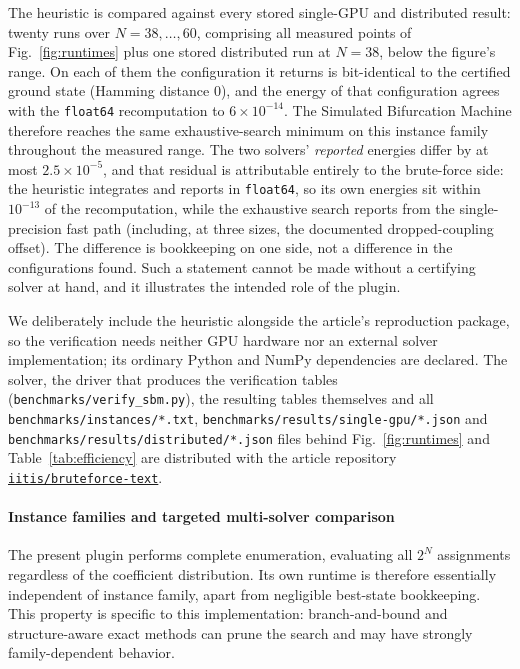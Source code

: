 \documentclass[preprint,12pt,a4paper]{elsarticle}
\newcommand{\datarepo}{https://github.com/iitis/bruteforce-text}
\newcommand{\datareponame}{\texttt{iitis/bruteforce-text}}
\begin{document}
The heuristic is compared against every stored single-GPU and distributed result: twenty runs
over $N=38,\dots,60$, comprising all measured points of Fig.~\ref{fig:runtimes} plus one stored
distributed run at $N=38$, below the figure's range. On each of them the configuration it returns is bit-identical to the
certified ground state (Hamming distance $0$), and the energy of that configuration agrees
with the \texttt{float64} recomputation to $6\times 10^{-14}$. The Simulated Bifurcation
Machine therefore reaches the same exhaustive-search minimum on this instance family throughout the
measured range. The two solvers' \emph{reported} energies differ by at most
$2.5\times 10^{-5}$, and that residual is attributable entirely to the brute-force side: the
heuristic integrates and reports in \texttt{float64}, so its own energies sit
within $10^{-13}$ of the recomputation, while the exhaustive search reports from the
single-precision fast path (including, at three sizes, the documented dropped-coupling
offset). The difference is bookkeeping on one side, not a
difference in the configurations found. Such a statement cannot be made without
a certifying solver at hand, and it illustrates the intended role of the plugin.

We deliberately include the heuristic alongside the article's reproduction package, so
the verification needs neither GPU hardware nor an external
solver implementation; its ordinary Python and NumPy dependencies are declared. The solver,
 the driver that produces the verification tables
(\texttt{benchmarks/verify\_sbm.py}), the resulting tables themselves and all
\texttt{benchmarks/instances/*.txt}, \texttt{benchmarks/results/single-gpu/*.json} and
\texttt{benchmarks/results/distributed/*.json} files behind Fig.~\ref{fig:runtimes} and
Table~\ref{tab:efficiency} are distributed with the article
repository \href{\datarepo}{\datareponame}.

\paragraph{Instance families and targeted multi-solver comparison}
The present plugin performs complete enumeration, evaluating all $2^{N}$ assignments
regardless of the coefficient distribution. Its own runtime is therefore essentially
independent of instance family, apart from negligible best-state bookkeeping. This property is
specific to this implementation: branch-and-bound and structure-aware exact methods can prune
the search and may have strongly family-dependent behavior.
\end{document}
